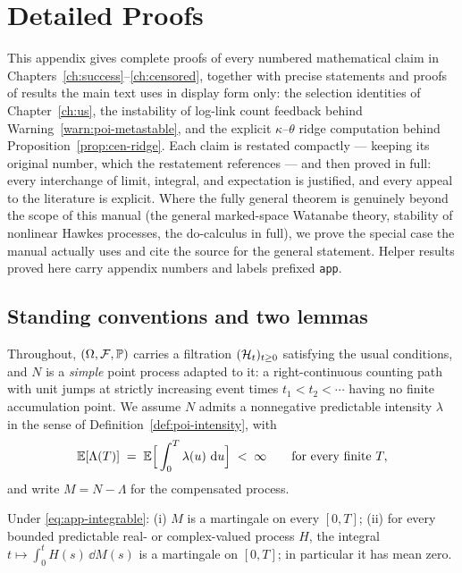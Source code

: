 \chapter{Detailed Proofs}
\label{app:proofs}

This appendix gives complete proofs of every numbered mathematical claim in
Chapters~\ref{ch:success}--\ref{ch:censored}, together with precise statements and proofs of results
the main text uses in display form only: the selection identities of Chapter~\ref{ch:us}, the
instability of log-link count feedback behind Warning~\ref{warn:poi-metastable}, and the explicit
$\kappa$--$\theta$ ridge computation behind Proposition~\ref{prop:cen-ridge}. Each claim is restated
compactly --- keeping its original number, which the restatement references --- and then proved in
full: every interchange of limit, integral, and expectation is justified, and every appeal to the
literature is explicit. Where the fully general theorem is genuinely beyond the scope of this manual
(the general marked-space Watanabe theory, stability of nonlinear Hawkes processes, the do-calculus
in full), we prove the special case the manual actually uses and cite the source for the general
statement. Helper results proved here carry appendix numbers and labels prefixed \texttt{app}.

\section{Standing conventions and two lemmas}
\label{app:proofs-standing}

Throughout, $(\Omega, \mathcal{F}, \mathbb{P})$ carries a filtration $(\mathcal{H}_t)_{t \ge 0}$ satisfying the
usual conditions, and $N$ is a \emph{simple} point process adapted to it: a right-continuous
counting path with unit jumps at strictly increasing event times $t_1 < t_2 < \cdots$ having no
finite accumulation point. We assume $N$ admits a nonnegative predictable intensity $\lambda$ in the
sense of Definition~\ref{def:poi-intensity}, with
\begin{equation}
\label{eq:app-integrable}
\mathbb{E}[\Lambda(T)] \;=\; \mathbb{E}\Big[\int_0^T \lambda(u)\,\,\mathrm{d} u\Big] \;<\; \infty
\qquad \text{for every finite } T,
\end{equation}
and write $M = N - \Lambda$ for the compensated process.

\begin{lemma}
\label{lem:app-mart}
Under \eqref{eq:app-integrable}: (i) $M$ is a martingale on every $[0,T]$; (ii) for every bounded
predictable real- or complex-valued process $H$, the integral $t \mapsto \int_0^{t} H(s)\,\dd M(s)$
is a martingale on $[0,T]$; in particular it has mean zero.
\end{lemma}

